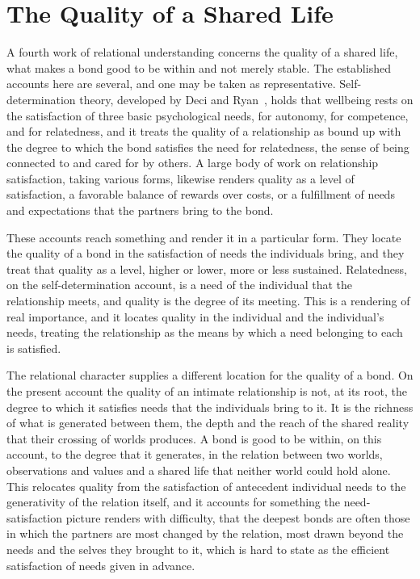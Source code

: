\section{The Quality of a Shared Life}
\label{p27:sec:wellbeing}

\noindent
A fourth work of relational understanding concerns the quality of a shared life, what makes a bond good to be within and not merely stable. The established accounts here are several, and one may be taken as representative. Self-determination theory, developed by Deci and Ryan~\parencite{deci2000self}, holds that wellbeing rests on the satisfaction of three basic psychological needs, for autonomy, for competence, and for relatedness, and it treats the quality of a relationship as bound up with the degree to which the bond satisfies the need for relatedness, the sense of being connected to and cared for by others. A large body of work on relationship satisfaction, taking various forms, likewise renders quality as a level of satisfaction, a favorable balance of rewards over costs, or a fulfillment of needs and expectations that the partners bring to the bond.

These accounts reach something and render it in a particular form. They locate the quality of a bond in the satisfaction of needs the individuals bring, and they treat that quality as a level, higher or lower, more or less sustained. Relatedness, on the self-determination account, is a need of the individual that the relationship meets, and quality is the degree of its meeting. This is a rendering of real importance, and it locates quality in the individual and the individual's needs, treating the relationship as the means by which a need belonging to each is satisfied.

The relational character supplies a different location for the quality of a bond. On the present account the quality of an intimate relationship is not, at its root, the degree to which it satisfies needs that the individuals bring to it. It is the richness of what is generated between them, the depth and the reach of the shared reality that their crossing of worlds produces. A bond is good to be within, on this account, to the degree that it generates, in the relation between two worlds, observations and values and a shared life that neither world could hold alone. This relocates quality from the satisfaction of antecedent individual needs to the generativity of the relation itself, and it accounts for something the need-satisfaction picture renders with difficulty, that the deepest bonds are often those in which the partners are most changed by the relation, most drawn beyond the needs and the selves they brought to it, which is hard to state as the efficient satisfaction of needs given in advance.


